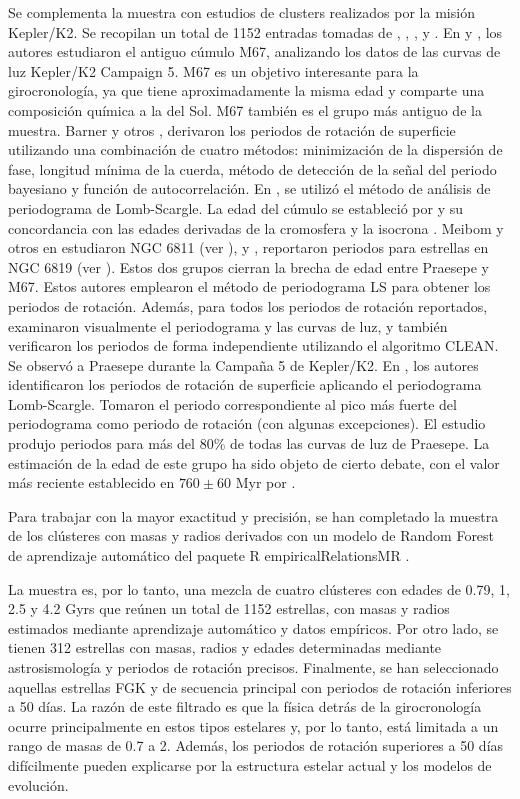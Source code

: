 Se complementa la muestra con estudios de clusters realizados por la misión Kepler/K2. Se recopilan un total de 1152 entradas tomadas de \cite{Barnes16}, \cite{Gonzalez16}, \cite{Meibom11}, \cite{Meibom15} y \cite{Rebull17}. En \cite{Barnes16} y \cite{Gonzalez16}, los autores estudiaron el antiguo cúmulo M67, analizando los datos de las curvas de luz Kepler/K2 Campaign 5. M67 es un objetivo interesante para la girocronología, ya que tiene aproximadamente la misma edad y comparte una composición química a la del Sol. M67 también es el grupo más antiguo de la muestra. Barner y otros \cite{Barnes16}, derivaron los periodos de rotación de superficie utilizando una combinación de cuatro métodos: minimización de la dispersión de fase, longitud mínima de la cuerda, método de detección de la señal del periodo bayesiano y función de autocorrelación. En \cite{Gonzalez16}, se utilizó el método de análisis de periodograma de Lomb-Scargle. La edad del cúmulo se estableció por \cite{Barnes16} y su concordancia con las edades derivadas de la cromosfera \cite{Giampapa06} y la isocrona \cite{Bellini10}. Meibom y otros en \cite{Meibom11} estudiaron NGC 6811 (ver \cite{Janes13}), y \cite{Meibom15}, reportaron periodos para estrellas en NGC 6819 (ver \cite{Jeffries13}). Estos dos grupos cierran la brecha de edad entre Praesepe y M67. Estos autores emplearon el método de periodograma LS para obtener los periodos de rotación. Además, para todos los periodos de rotación reportados, examinaron visualmente el periodograma y las curvas de luz, y también verificaron los periodos de forma independiente utilizando el algoritmo CLEAN. Se observó a Praesepe durante la Campaña 5 de Kepler/K2. En \cite{Rebull17}, los autores identificaron los periodos de rotación de superficie aplicando el periodograma Lomb-Scargle. Tomaron el periodo correspondiente al pico más fuerte del periodograma como periodo de rotación (con algunas excepciones). El estudio produjo periodos para más del 80\% de todas las curvas de luz de Praesepe. La estimación de la edad de este grupo ha sido objeto de cierto debate, con el valor más reciente establecido en $760 \pm 60$ Myr por \cite{Brandt15}.

Para trabajar con la mayor exactitud y precisión, se han completado la muestra de los clústeres con masas y radios derivados con un modelo de Random Forest de aprendizaje automático del paquete R empiricalRelationsMR \cite{Moya18}.

La muestra es, por lo tanto, una mezcla de cuatro clústeres con edades de 0.79, 1, 2.5 y 4.2 Gyrs que reúnen un total de 1152 estrellas, con masas y radios estimados mediante aprendizaje automático y datos empíricos. Por otro lado, se tienen 312 estrellas con masas, radios y edades determinadas mediante astrosismología y periodos de rotación precisos. Finalmente, se han seleccionado aquellas estrellas FGK y de secuencia principal con periodos de rotación inferiores a 50 días. La razón de este filtrado es que la física detrás de la girocronología ocurre principalmente en estos tipos estelares y, por lo tanto, está limitada a un rango de masas de 0.7 a 2. Además, los periodos de rotación superiores a 50 días difícilmente pueden explicarse por la estructura estelar actual y los modelos de evolución.


